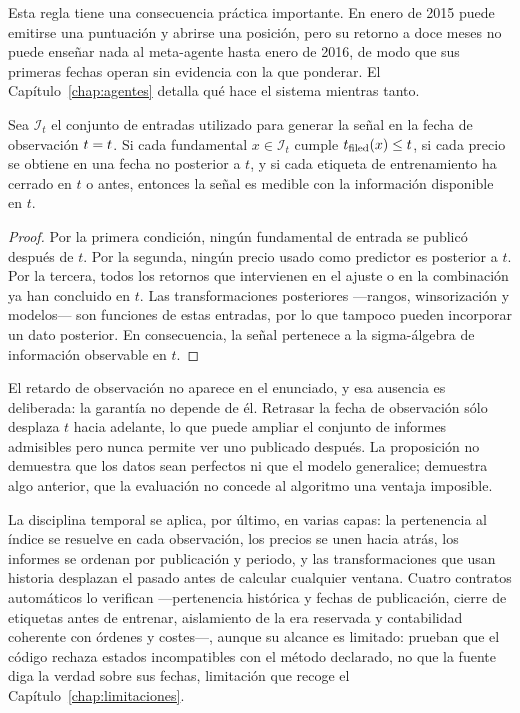 Esta regla tiene una consecuencia práctica importante. En enero de 2015 puede emitirse una
puntuación y abrirse una posición, pero su retorno a doce meses no puede enseñar nada al meta-agente
hasta enero de 2016, de modo que sus primeras fechas operan sin evidencia con la que ponderar. El
Capítulo~\ref{chap:agentes} detalla qué hace el sistema mientras tanto.

\begin{proposicion}
\label{prop:sin-fuga}
Sea $\mathcal{I}_t$ el conjunto de entradas utilizado para generar la señal en la fecha de
observación \(t=t\). Si cada fundamental $x\in\mathcal{I}_t$ cumple $t_{\text{filed}}(x)\leq t$, si cada
precio se obtiene en una fecha no posterior a $t$, y si cada etiqueta de entrenamiento ha cerrado en
$t$ o antes, entonces la señal es medible con la información disponible en $t$.
\end{proposicion}

\begin{proof}
Por la primera condición, ningún fundamental de entrada se publicó después de $t$. Por la segunda,
ningún precio usado como predictor es posterior a $t$. Por la tercera, todos los retornos que
intervienen en el ajuste o en la combinación ya han concluido en $t$. Las transformaciones
posteriores ---rangos, winsorización y modelos--- son funciones de estas entradas, por lo que
tampoco pueden incorporar un dato posterior. En consecuencia, la señal pertenece a la sigma-álgebra
de información observable en $t$.
\end{proof}

El retardo de observación no aparece en el enunciado, y esa ausencia es deliberada: la garantía no
depende de él. Retrasar la fecha de observación sólo desplaza $t$ hacia adelante, lo que puede
ampliar el conjunto de informes admisibles pero nunca permite ver uno publicado después. La
proposición no demuestra que los datos sean perfectos ni que el modelo generalice; demuestra algo
anterior, que la evaluación no concede al algoritmo una ventaja imposible.

La disciplina temporal se aplica, por último, en varias capas: la pertenencia al índice se resuelve en cada
observación, los precios se unen hacia atrás, los informes se ordenan por publicación y periodo, y
las transformaciones que usan historia desplazan el pasado antes de calcular cualquier ventana.
Cuatro contratos automáticos lo verifican ---pertenencia histórica y fechas de publicación, cierre
de etiquetas antes de entrenar, aislamiento de la era reservada y contabilidad coherente con órdenes
y costes---, aunque su alcance es limitado: prueban que el código rechaza estados incompatibles con
el método declarado, no que la fuente diga la verdad sobre sus fechas, limitación que recoge el
Capítulo~\ref{chap:limitaciones}.

